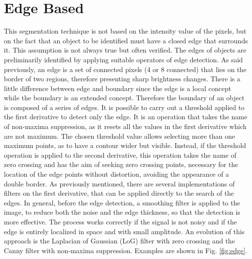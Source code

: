 \documentclass[final,a4paper,12pt,english]{UnicaPhdThesis3}
\begin{document}
\section{Edge Based}
This segmentation technique is not based on the intensity value of the pixels, but on the fact that an object to be identified must have a closed edge that surrounds it. This assumption is not always true but often verified. The edges of objects are preliminarily identified by applying suitable operators of edge detection. As said previously, an edge is a set of connected pixels (4 or 8 connected) that lies on the border of two regions, therefore presenting sharp brightness changes. There is a little difference between edge and boundary since the edge is a local concept while the boundary is an extended concept. Therefore the boundary of an object is composed of a series of edges.
It is possible to carry out a threshold applied to the first derivative to detect only the edge. It is an operation that takes the name of non-maxima suppression, as it resets all the values ​​in the first derivative which are not maximum. The chosen threshold value allows selecting more than one maximum points, as to have a contour wider but visible. Instead, if the threshold operation is applied to the second derivative, this operation takes the name of zero crossing and has the aim of seeking zero crossing points, necessary for the location of the edge points without distortion, avoiding the appearance of a double border. As previously mentioned, there are several implementations of filters on the first derivative, that can be applied directly to the search of the edges. In general, before the edge detection, a smoothing filter is applied to the image, to reduce both the noise and the edge thickness, so that the detection is more effective. The process works correctly if the signal is not noisy and if the edge is entirely localized in space and with small amplitude. An evolution of this approach is the Laplacian of Gaussian (\acs{LoG}) filter with zero crossing and the Canny filter with non-maxima suppression.
Examples are shown in Fig. \ref{fig:edge}.
\end{document}
